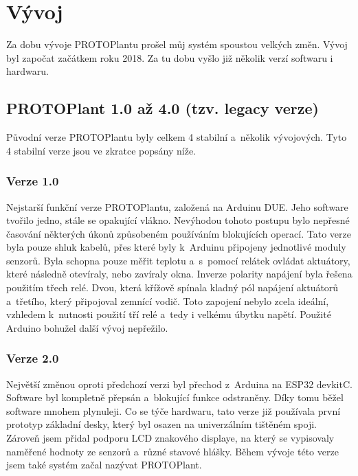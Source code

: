 \chapter{Vývoj}
Za dobu vývoje PROTOPlantu prošel můj systém spoustou velkých změn.
Vývoj byl započat začátkem roku 2018.
Za tu dobu vyšlo již několik verzí softwaru i hardwaru.

\section{PROTOPlant 1.0 až 4.0 (tzv. legacy verze)}
Původní verze PROTOPlantu byly celkem 4 stabilní a~několik vývojových.
Tyto 4 stabilní verze jsou ve zkratce popsány níže.

\subsection{Verze 1.0}
Nejstarší funkční verze PROTOPlantu, založená na Arduinu DUE. 
Jeho software tvořilo jedno, stále se opakující vlákno.
Nevýhodou tohoto postupu bylo nepřesné časování některých úkonů způsobeném používáním blokujících operací.
Tato verze byla pouze shluk kabelů, přes které byly k~Arduinu připojeny jednotlivé moduly senzorů.
Byla schopna pouze měřit teplotu a~s~pomocí relátek ovládat aktuátory, které následně otevíraly, nebo zavíraly okna.
Inverze polarity napájení byla řešena použitím třech relé.
Dvou, která křížově spínala kladný pól napájení aktuátorů a~třetího, který připojoval zemnící vodič.
Toto zapojení nebylo zcela ideální, vzhledem k~nutnosti použití tří relé a~tedy i velkému úbytku napětí.
Použité Arduino bohužel další vývoj nepřežilo.

\subsection{Verze 2.0}
Největší změnou oproti předchozí verzi byl přechod z~Arduina na ESP32 devkitC.
Software byl kompletně přepsán a~blokující funkce odstraněny.
Díky tomu běžel software mnohem plynuleji.
Co se týče hardwaru, tato verze již používala první prototyp základní desky, který byl osazen na univerzálním tištěném spoji.
Zároveň jsem přidal podporu LCD znakového displaye, na který se vypisovaly naměřené hodnoty ze senzorů a~různé stavové hlášky.
Během vývoje této verze jsem také systém začal nazývat PROTOPlant.

